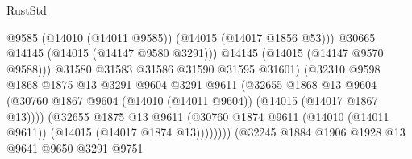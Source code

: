 \begin{lexlean}{RustStd}
\begin{coremodule}
                                                @9585
                                                (@14010 (@14011 @9585))
                                                (@14015 (@14017 @1856 @53)))
                                              @30665
                                              @14145
                                              (@14015 (@14147 @9580 @3291)))
                                            @14145
                                            (@14015 (@14147 @9570 @9588)))
                                          @31580
                                          @31583
                                          @31586
                                          @31590
                                          @31595
                                          @31601)
                                        (@32310
                                          @9598
                                          @1868
                                          @1875
                                          @13
                                          @3291
                                          @9604
                                          @3291
                                          @9611
                                          (@32655
                                            @1868
                                            @13
                                            @9604
                                            (@30760
                                              @1867
                                              @9604
                                              (@14010 (@14011 @9604))
                                              (@14015 (@14017 @1867 @13))))
                                          (@32655
                                            @1875
                                            @13
                                            @9611
                                            (@30760
                                              @1874
                                              @9611
                                              (@14010 (@14011 @9611))
                                              (@14015 (@14017 @1874 @13))))))))
                                  (@32245
                                    @1884
                                    @1906
                                    @1928
                                    @13
                                    @9641
                                    @9650
                                    @3291
                                    @9751

\end{coremodule}
\end{lexlean}
